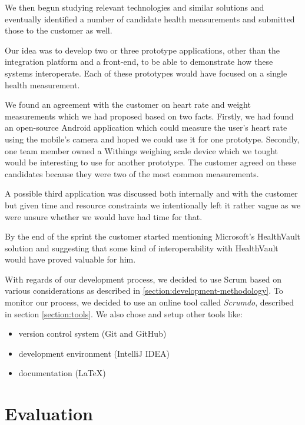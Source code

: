 We then begun studying relevant technologies and similar solutions and eventually identified a number of candidate health measurements and submitted those to the customer as well.

Our idea was to develop two or three prototype applications, other than the integration platform and a front-end, to be able to demonstrate how these systems interoperate.
Each of these prototypes would have focused on a single health measurement.

We found an agreement with the customer on heart rate and weight measurements which we had proposed based on two facts. 
Firstly, we had found an open-source Android application which could measure the user's heart rate using the mobile's camera and hoped we could use it for one prototype.
Secondly, one team member owned a Withings weighing scale device which we tought would be interesting to use for another prototype.
The customer agreed on these candidates because they were two of the most common measurements.

A possible third application was discussed both internally and with the customer but given time and resource constraints we intentionally left it rather vague as we were unsure whether we would have had time for that.

By the end of the sprint the customer started mentioning Microsoft's HealthVault solution and suggesting that some kind of interoperability with HealthVault would have proved valuable for him.

With regards of our development process, we decided to use Scrum based on various considerations as described in \ref{section:development-methodology}. 
To monitor our process, we decided to use an online tool called \textit{Scrumdo}, described in section \ref{section:tools}. 
We also chose and setup other tools like:
\begin{itemize}
\item version control system (Git and GitHub)
\item development environment (IntelliJ IDEA)
\item documentation (LaTeX)
\end{itemize}

\section{Evaluation}

